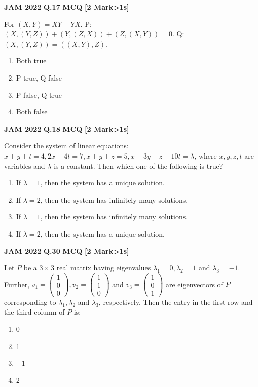 \documentclass[11pt,a4paper]{article}
\newcommand{\pyqheader}[4]{%
    \noindent\begin{tcolorbox}[
        colback=badgebg,
        colframe=secondary,
        arc=2mm,
        boxrule=0.6pt,
        top=1.5mm,bottom=1.5mm,left=2mm,right=2mm
    ]
        \textbf{\textcolor{primary}{JAM #1}} \hfill \textbf{Q.#2} \hfill \textsc{\textbf{#3}} \hfill \textbf{[#4 Mark\ifnum#4>1s\fi]}
    \end{tcolorbox}\vspace{-1mm}
}
\begin{document}
\pyqheader{2022}{17}{MCQ}{2}
For $(X,Y)=XY-YX$. P: $(X,(Y,Z))+(Y,(Z,X))+(Z,(X,Y))=0$. Q: $(X,(Y,Z))=((X,Y),Z)$.
\begin{enumerate}[label=(\Alph*)]
    \item Both true
    \item P true, Q false
    \item P false, Q true
    \item Both false
\end{enumerate}

\pyqheader{2022}{18}{MCQ}{2}
Consider the system of linear equations:
$x+y+t=4, 2x-4t=7, x+y+z=5, x-3y-z-10t=\lambda$,
where $x,y,z,t$ are variables and $\lambda$ is a constant. Then which one of the following is true?
\begin{enumerate}[label=(\Alph*)]
    \item If $\lambda=1$, then the system has a unique solution.
    \item If $\lambda=2$, then the system has infinitely many solutions.
    \item If $\lambda=1$, then the system has infinitely many solutions.
    \item If $\lambda=2$, then the system has a unique solution.
\end{enumerate}

\pyqheader{2022}{30}{MCQ}{2}
Let $P$ be a $3\times 3$ real matrix having eigenvalues $\lambda_1=0, \lambda_2=1$ and $\lambda_3=-1$. Further, $v_1=\begin{pmatrix}1\\0\\0\end{pmatrix}, v_2=\begin{pmatrix}1\\1\\0\end{pmatrix}$ and $v_3=\begin{pmatrix}1\\0\\1\end{pmatrix}$ are eigenvectors of $P$ corresponding to $\lambda_1, \lambda_2$ and $\lambda_3$, respectively. Then the entry in the first row and the third column of $P$ is:
\begin{enumerate}[label=(\Alph*)]
    \item 0
    \item 1
    \item $-1$
    \item 2
\end{enumerate}
\end{document}
